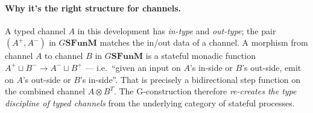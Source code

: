 \documentclass[11pt]{article}
\newcommand{\SFunM}{\mathbf{SFunM}}
\begin{document}
\paragraph{Why it's the right structure for channels.}
A typed channel $A$ in this development has \emph{in-type} and
\emph{out-type}; the pair $(A^+, A^-)$ in $G\SFunM$ matches the
in/out data of a channel.  A morphism from channel $A$ to channel $B$
in $G\SFunM$ is a stateful monadic function
$A^+ \sqcup B^- \to A^- \sqcup B^+$ --- i.e.\ ``given an input on
$A$'s in-side or $B$'s out-side, emit on $A$'s out-side or $B$'s
in-side''.  That is precisely a bidirectional step function on the
combined channel $A \otimes B^T$.  The G-construction therefore
\emph{re-creates the type discipline of typed channels} from the
underlying category of stateful processes.
\end{document}
